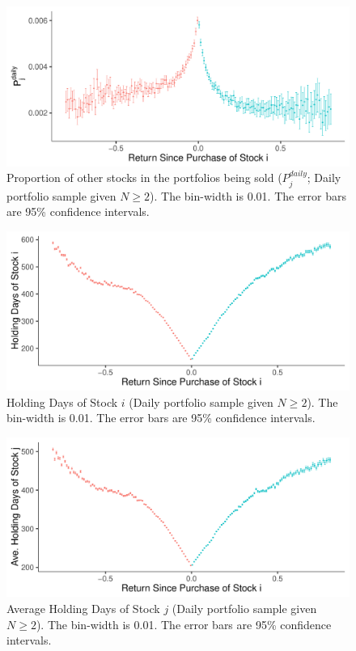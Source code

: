 \documentclass[11pt, a4paper]{article}
\begin{document}
\begin{appendices}
\begin{figure}[H]
	\centering
	\includegraphics[width=0.8\columnwidth]{barc_other_sold_daily_3.pdf}
	\caption{Proportion of other stocks in the portfolios being sold ($P^{daily}_{j}$; Daily portfolio sample given $N\geq2$). The bin-width is 0.01. The error bars are 95\% confidence intervals.}
	\label{figure:prop_others_n2}
\end{figure}



\begin{figure}[H]
	\centering
	\includegraphics[width=0.8\columnwidth]{barc_holding_days_daily_N2_3.pdf}
	\caption{Holding Days of Stock $i$ (Daily portfolio sample given $N\geq2$). The bin-width is 0.01. The error bars are 95\% confidence intervals.}
	\label{figure:holding_days_n2}
\end{figure}

\begin{figure}[H]
	\centering
	\includegraphics[width=0.8\columnwidth]{barc_holding_days_others_daily_N2_3.pdf}
	\caption{Average Holding Days of Stock $j$ (Daily portfolio sample given $N\geq2$). The bin-width is 0.01. The error bars are 95\% confidence intervals.}
	\label{figure:holding_days_others_n2}
\end{figure}



\end{appendices}
\end{document}
